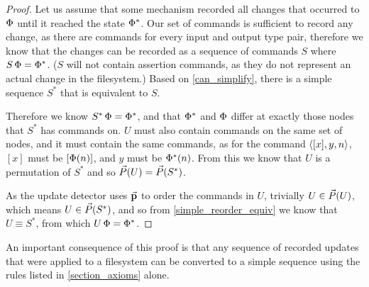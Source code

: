 \begin{proof}
Let us assume that some mechanism recorded all changes that occurred
to $\Phi$ until it reached the state $\Phi^*$.
Our set of commands is sufficient to record any change, as
there are commands for every input and output type pair, therefore
we know that the changes can be recorded as a sequence of commands $S$
where $S\,\Phi=\Phi^*$.
($S$ will not contain assertion commands, as they do not
represent an actual change in the filesystem.)
Based on \cref{can_simplify}, there is a simple sequence $S^*$
that is equivalent to $S$.

Therefore we know $S^*\,\Phi=\Phi^*$, and that
$\Phi^*$ and $\Phi$ differ at exactly those nodes that $S^*$ has commands on.
$U$ must also contain commands on the same set of nodes,
and it must contain the same commands,
as for the command $\langle{[x],y,n}\rangle$, $[x]$ must be $[\Phi(n)]$, and $y$ must be $\Phi^*(n)$.
From this we know that $U$ is a permutation of $S^*$ and so $\vec{P}({U})=\vec{P}({S^*})$.

As the update detector uses $\mathrel{\vec{\mathbf{p}}}$ to order the commands in $U$, trivially $U\in\vec{P}({U})$,
which means $U\in\vec{P}({S^*})$,
and so from \cref{simple_reorder_equiv} we know that $U\equiv S^*$,
from which $U\,\Phi=\Phi^*$.
\end{proof}

An important consequence of this proof is that any sequence
of recorded updates that were applied to a filesystem can be
converted to a simple sequence using the rules listed in
\cref{section_axioms} alone.

